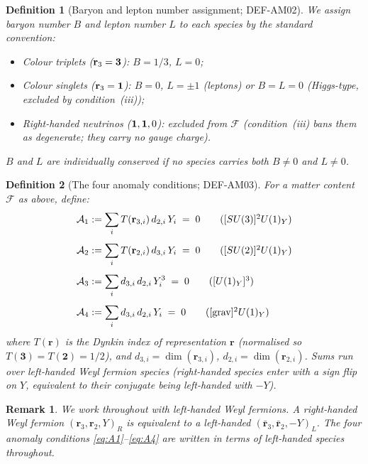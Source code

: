 \documentclass[12pt, a4paper]{article}
\newtheorem{definition}{Definition}[section]
\newtheorem{remark}{Remark}[section]
\begin{document}
\begin{definition}[Baryon and lepton number assignment; DEF-AM02]
\label{def:BL}
We assign baryon number $B$ and lepton number $L$ to each species
by the standard convention:
\begin{itemize}[leftmargin=*, noitemsep]
  \item Colour triplets ($\mathbf{r}_3 = {\bf 3}$): $B = 1/3$,
    $L = 0$;
  \item Colour singlets ($\mathbf{r}_3 = {\bf 1}$): $B = 0$,
    $L = \pm 1$ (leptons) or $B = L = 0$ (Higgs-type, excluded by
    condition~(iii));
  \item Right-handed neutrinos (${\bf 1}, {\bf 1}, 0$): excluded
    from $\mathcal{F}$ (condition~(iii) bans them as degenerate;
    they carry no gauge charge).
\end{itemize}
$B$ and $L$ are \emph{individually conserved} if no species carries
both $B \neq 0$ and $L \neq 0$.
\end{definition}

\begin{definition}[The four anomaly conditions; DEF-AM03]
\label{def:anomalies}
For a matter content $\mathcal{F}$ as above, define:
\begin{align}
  \mathcal{A}_1 &:= \sum_{i} T(\mathbf{r}_{3,i})\, d_{2,i}\, Y_i
  \;=\; 0
  \tag{$[SU(3)]^2 U(1)_Y$}
  \label{eq:A1} \\[4pt]
  \mathcal{A}_2 &:= \sum_{i} T(\mathbf{r}_{2,i})\, d_{3,i}\, Y_i
  \;=\; 0
  \tag{$[SU(2)]^2 U(1)_Y$}
  \label{eq:A2} \\[4pt]
  \mathcal{A}_3 &:= \sum_{i} d_{3,i}\, d_{2,i}\, Y_i^3
  \;=\; 0
  \tag{$[U(1)_Y]^3$}
  \label{eq:A3} \\[4pt]
  \mathcal{A}_4 &:= \sum_{i} d_{3,i}\, d_{2,i}\, Y_i
  \;=\; 0
  \tag{$[{\rm grav}]^2 U(1)_Y$}
  \label{eq:A4}
\end{align}
where $T(\mathbf{r})$ is the Dynkin index of representation
$\mathbf{r}$ (normalised so $T(\mathbf{3}) = T(\mathbf{2}) = 1/2$),
and $d_{3,i} = \dim(\mathbf{r}_{3,i})$, $d_{2,i} = \dim(\mathbf{r}_{2,i})$.
Sums run over left-handed Weyl fermion species (right-handed species
enter with a sign flip on $Y$, equivalent to their conjugate being
left-handed with $-Y$).
\end{definition}

\begin{remark}
We work throughout with left-handed Weyl fermions. A right-handed
Weyl fermion $(\mathbf{r}_3, \mathbf{r}_2, Y)_R$ is equivalent to a
left-handed $(\bar{\mathbf{r}}_3, \bar{\mathbf{r}}_2, -Y)_L$.
The four anomaly conditions \eqref{eq:A1}--\eqref{eq:A4} are
written in terms of left-handed species throughout.
\end{remark}
\end{document}
